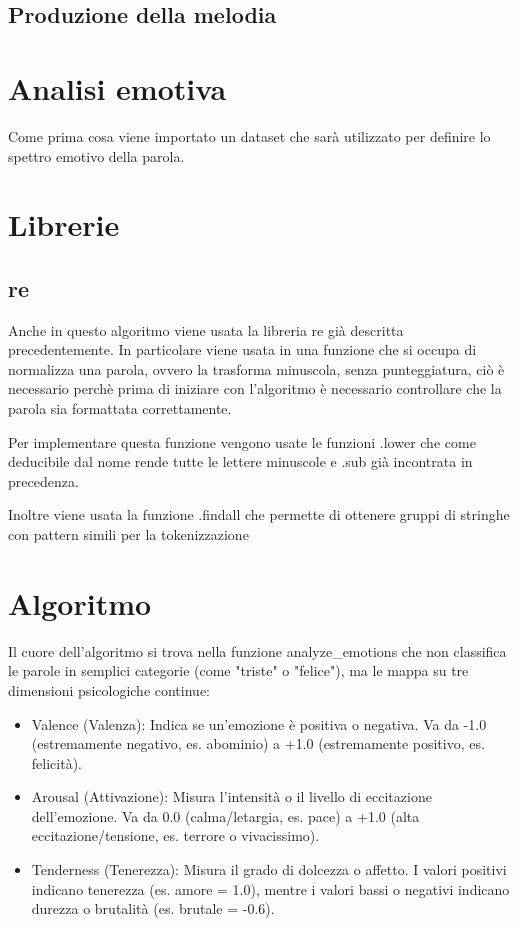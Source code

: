 \subsection{Produzione della melodia}

\section{Analisi emotiva}
Come prima cosa viene importato un dataset che sarà utilizzato per definire lo spettro emotivo della parola.
\section{Librerie}
\subsection{re}
Anche in questo algoritmo viene usata la libreria re già descritta precedentemente.
In particolare viene usata in una funzione che si occupa di normalizza una parola, ovvero la trasforma minuscola, senza punteggiatura, ciò è necessario perchè prima di iniziare con l'algoritmo è necessario controllare che la parola sia formattata correttamente.

Per implementare questa funzione vengono usate le funzioni .lower che come deducibile dal nome rende tutte le lettere minuscole e .sub già incontrata in precedenza.

Inoltre viene usata la funzione .findall che permette di ottenere gruppi di stringhe con pattern simili per la tokenizzazione 
\section{Algoritmo}
Il cuore dell'algoritmo si trova nella funzione analyze\_emotions che non classifica le parole in semplici categorie (come "triste" o "felice"), ma le mappa su tre dimensioni psicologiche continue:
\begin{itemize}
\item Valence (Valenza): Indica se un'emozione è positiva o negativa. Va da -1.0 (estremamente negativo, es. abominio) a +1.0 (estremamente positivo, es. felicità).
\item Arousal (Attivazione): Misura l'intensità o il livello di eccitazione dell'emozione. Va da 0.0 (calma/letargia, es. pace) a +1.0 (alta eccitazione/tensione, es. terrore o vivacissimo).
\item Tenderness (Tenerezza): Misura il grado di dolcezza o affetto. I valori positivi indicano tenerezza (es. amore = 1.0), mentre i valori bassi o negativi indicano durezza o brutalità (es. brutale = -0.6).
\end{itemize}

